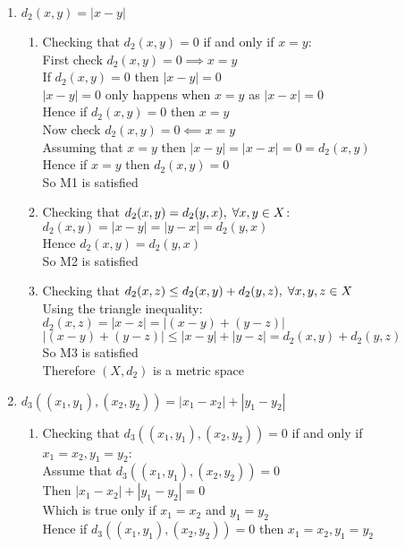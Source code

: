 \documentclass[,oneside]{article}
\numberwithin{equation}{section}
\begin{document}
\begin{enumerate}[label=(\roman*)]
\begin{enumerate}[label=\alph*)]
    \end{enumerate}
    
         \item $d_2(x,y)=|x-y|$ \\
         \begin{enumerate}[label=\alph*)]
       \item Checking that $d_2(x,y) = 0$ if and only if $x = y$:
        \\First check $d_2(x,y) = 0\implies x=y$\\
      If $d_2(x,y)=0$ then $|x-y|=0$\\
      $|x-y|=0$ only happens when $x=y$ as $|x-x|=0$\\
        Hence if $d_2(x,y) = 0$ then $x=y$\\
        
        Now check $d_2(x,y)=0 \impliedby x=y$\\
        Assuming that $x=y$ then $|x-y|=|x-x|=0=d_2(x,y)$ \\
        Hence if $x=y$ then $d_2(x,y)=0$\\
        So M1 is satisfied\\
        \item Checking that $d_2(x,y)=d_2(y,x),\hspace{0.1cm} \forall x,y \in X$:
        \\$d_2(x,y)=|x-y|=|y-x|=d_2(y,x)$
        \\Hence $d_2(x,y)=d_2(y,x)$\\
        So M2 is satisfied\\
        \item Checking that $d_2(x,z) \leq d_2(x,y) + d_2(y,z), \hspace{0.1cm} \forall x,y,z \in X$\\
        Using the triangle inequality:\\
        $d_2(x,z)=|x-z|=|(x-y)+(y-z)|$\\
        $|(x-y)+(y-z)|\leq|x-y|+|y-z|=d_2(x,y)+d_2(y,z)$\\
        So M3 is satisfied\\
        Therefore $(X,d_2)$ is a metric space\\
        
    \end{enumerate}
    
    \item $d_3((x_1,y_1),(x_2,y_2))=|x_1-x_2|+|y_1-y_2|$ \\
         \begin{enumerate}[label=\alph*)]
       \item Checking that $d_3((x_1,y_1),(x_2,y_2)) = 0$ if and only if $x_1 = x_2, y_1 = y_2$:\\
        Assume that $d_3((x_1,y_1),(x_2,y_2)) = 0$\\ 
        Then $|x_1-x_2|+|y_1-y_2|=0$\\
        Which is true only if $x_1=x_2$ and $y_1=y_2$\\
        Hence if $d_3((x_1,y_1), (x_2,y_2))= 0$ then $x_1=x_2, y_1=y_2$\\
        

\end{enumerate}
\end{enumerate}
\end{document}
